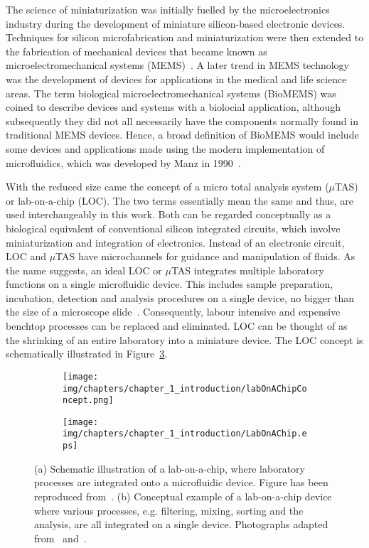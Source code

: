 The science of miniaturization was initially fuelled by the microelectronics industry during the development of miniature silicon-based electronic devices. Techniques for silicon microfabrication and miniaturization were then extended to the fabrication of mechanical devices that became known as microelectromechanical systems (MEMS)~\cite{Petersen1982}. A later trend in MEMS technology was the development of devices for applications in the medical and life science areas. The term biological microelectromechanical systems (BioMEMS) was coined to describe devices and systems with a biolocial application, although subsequently they did not all necessarily have the components normally found in traditional MEMS devices. Hence, a broad definition of BioMEMS would include some devices and applications made using the modern implementation of microfluidics, which was developed by Manz \etal{} in 1990~\cite{Manz1990}.

With the reduced size came the concept of a micro total analysis system ($\mu$TAS) or lab-on-a-chip (LOC). The two terms essentially mean the same and thus, are used interchangeably in this work. Both can be regarded conceptually as a biological equivalent of conventional silicon integrated circuits, which involve miniaturization and integration of electronics. Instead of an electronic circuit, LOC and $\mu$TAS have microchannels for guidance and manipulation of fluids. As the name suggests, an ideal LOC or $\mu$TAS integrates multiple laboratory functions on a single microfluidic device. This includes sample preparation, incubation, detection and analysis procedures on a single device, no bigger than the size of a microscope slide~\cite{Demello2006,Yager2006}. Consequently, labour intensive and expensive benchtop processes can be replaced and eliminated. LOC can be thought of as the shrinking of an entire laboratory into a miniature device. The LOC concept is schematically illustrated in Figure~\ref{fig:labOnAChipConcept}.

\begin{figure}[htb]
        \centering
        \begin{subfigure}[b]{0.42\textwidth}
        		 \texttt{[image: img/chapters/chapter\_1\_introduction/labOnAChipConcept.png]}
                \caption{}
                \label{fig:labOnAChipConceptIdea}
        \end{subfigure}
        \hfill
        \begin{subfigure}[b]{0.57\textwidth}
                \texttt{[image: img/chapters/chapter\_1\_introduction/LabOnAChip.eps]}
                \caption{}
                \label{fig:labOnAChipConceptExample}
        \end{subfigure}
        \caption[Concept of a lab-on-a-chip]{(a) Schematic illustration of a lab-on-a-chip, where laboratory processes are integrated onto a microfluidic device. Figure has been reproduced from~\cite{Chow2002}. (b) Conceptual example of a lab-on-a-chip device where various processes, e.g. filtering, mixing, sorting and the analysis, are all integrated on a single device. Photographs adapted from~\cite{Englert2009} and~\cite{Lillehoj2010}.}
        \label{fig:labOnAChipConcept}
\end{figure}

